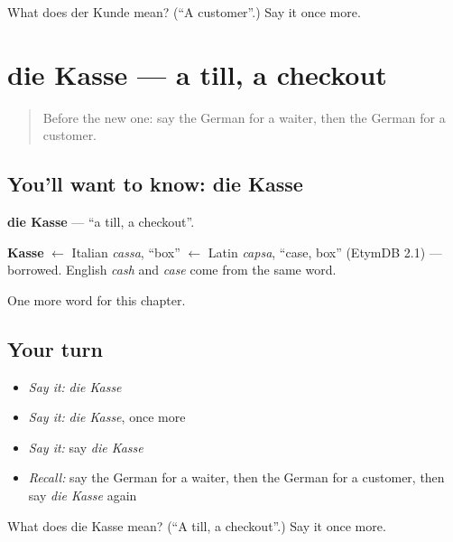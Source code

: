 \begin{tcolorbox}[breakable,colback=teal!4,colframe=teal!35!black,title={Before you move on}]
What does der Kunde mean? (\textquotedblleft{}A customer\textquotedblright{}.) Say it once more.
\end{tcolorbox}
\section[die Kasse]{die Kasse — a till, a checkout}

\label{lesson:GE-C126-kasse}



\begin{quote}
Before the new one: say the German for a waiter, then the German for a customer.
\end{quote}

\subsection*{You'll want to know: die Kasse}
\textbf{die Kasse} — \textquotedblleft{}a till, a checkout\textquotedblright{}.

\begin{cousinweb}
\textbf{Kasse} $\leftarrow$ Italian \emph{cassa}, \textquotedblleft{}box\textquotedblright{} $\leftarrow$ Latin \emph{capsa}, \textquotedblleft{}case, box\textquotedblright{} (EtymDB 2.1) — borrowed. English \emph{cash} and \emph{case} come from the same word.
\end{cousinweb}

\begin{grammarlens}[title={What you've built}]
One more word for this chapter.
\end{grammarlens}

\subsection*{Your turn}
\begin{itemize}
\raggedright
  \item \emph{Say it:} \emph{die Kasse}
  \item \emph{Say it:} \emph{die Kasse}, once more
  \item \emph{Say it:} say \emph{die Kasse}
  \item \emph{Recall:} say the German for a waiter, then the German for a customer, then say \emph{die Kasse} again
\end{itemize}

\begin{tcolorbox}[breakable,colback=teal!4,colframe=teal!35!black,title={Before you move on}]
What does die Kasse mean? (\textquotedblleft{}A till, a checkout\textquotedblright{}.) Say it once more.
\end{tcolorbox}
